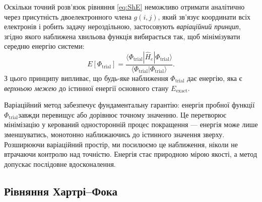 Оскільки точний розв'язок рівняння \eqref{eq:ShE} неможливо отримати аналітично через присутність двоелектронного члена $g(i, j)$, який зв’язує координати всіх електронів і робить задачу нероздільною, застосовують \emph{варіаційний принцип}, згідно якого наближена хвильова функція вибирається так, щоб мінімізувати середню енергію системи:
\[
	E[\Phi_\text{trial}] =
	\frac{\langle \Phi_\text{trial} | \hat{H}_e | \Phi_\text{trial} \rangle}
	{\langle \Phi_\text{trial} | \Phi_\text{trial} \rangle}.
\]
З цього принципу випливає, що будь-яке наближення \(\Phi_\text{trial}\) дає енергію, яка є \emph{верхньою межею} до істинної енергії основного стану \(E_{\text{exact}}\).
\begin{commentbox}
	Варіаційний метод забезпечує фундаментальну гарантію: енергія пробної функції \(\Phi_\text{trial}\)​ завжди перевищує або дорівнює точному значенню. Це перетворює мінімізацію у керований односторонній процес покращення --- енергія може лише зменшуватись, монотонно наближаючись до істинного значення зверху. Розширюючи варіаційний простір, ми посилюємо це наближення, ніколи не втрачаючи контролю над точністю. Енергія стає природною мірою якості, а метод допускає послідовне вдосконалення.
\end{commentbox}


\subsection{Рівняння Хартрі–Фока}

